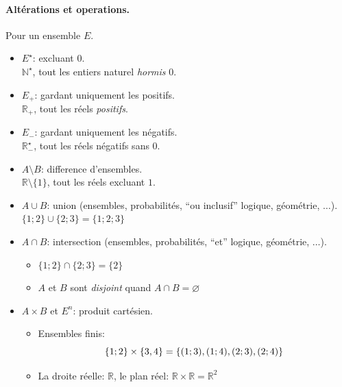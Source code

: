 \documentclass[12pt]{article}
\begin{document}
\paragraph{Altérations et operations.} 
Pour un ensemble $E$.
\begin{itemize}
    \item $E^{\star}$: excluant $0$. \\
        \Ex $\mathbb{N}^{\star}$, tout les entiers naturel 
        \textit{hormis} $0$.
    \item $E_{+}$: gardant uniquement les positifs. \\
        \Ex $\mathbb{R}_{+}$, tout les réels \textit{positifs}.
    \item $E_{-}$: gardant uniquement les négatifs. \\
        \Ex $\mathbb{R}^{\star}_{-}$, tout les réels négatifs sans $0$.
    
    \item[\Il] $A \setminus B$: difference d'ensembles. \\
        \Ex $\mathbb{R} \setminus \{1\}$, tout les réels excluant $1$.
    \item $A \cup B$: union 
        (ensembles, probabilités, \enquote{ou inclusif} logique, géométrie, $\dots$).\\
        \Ex $\{1; 2\} \cup \{2; 3\} = \{1; 2; 3\}$
    \item $A \cap B$: intersection 
        (ensembles, probabilités, \enquote{et} logique, géométrie, $\dots$).\\
        \Ex \begin{itemize}
            \item $\{1; 2\} \cap \{2; 3\} = \{2\}$
            \item $A$ et $B$ sont \textit{disjoint} quand 
                $A \cap B = \varnothing$
        \end{itemize}
    \item $A \times B$ et $E^{n}$: produit cartésien. \\
        \Ex \begin{itemize}
            \item Ensembles finis: $$
                \left\{1; 2\right\} \times \left\{3, 4\right\} 
              = \left\{(1; 3), (1; 4), (2; 3), (2; 4)\right\}
            $$
            \item La droite réelle: $\mathbb{R}$,
                le plan réel: $\mathbb{R} \times \mathbb{R} = \mathbb{R}^2$
        \end{itemize}
    
\end{itemize}
\end{document}
